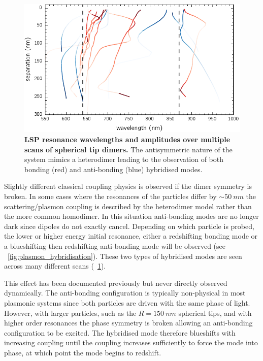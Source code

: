 \documentclass[a4paper]{article}
\begin{document}
\begin{figure}[h]
\centering
\includegraphics{figures/classical_mode_fits}
\caption[LSP resonance wavelengths and amplitudes over multiple scans of spherical tip dimers]{\textbf{LSP resonance wavelengths and amplitudes over multiple scans of spherical tip dimers.} The antisymmetric nature of the system mimics a heterodimer leading to the observation of both bonding (red) and anti-bonding (blue) hybridised modes.}
\label{fig:heterodimer_measurements}
\end{figure}

Slightly different classical coupling physics is observed if the dimer symmetry is broken. In some cases where the resonances of the particles differ by $\sim\SI{50}{nm}$ the scattering/plasmon coupling is described by the heterodimer model rather than the more common homodimer. In this situation anti-bonding modes are no longer dark since dipoles do not exactly cancel. Depending on which particle is probed, the lower or higher energy initial resonance, either a redshifting bonding mode or a blueshifting then redshifting anti-bonding mode will be observed (see \figurename~\ref{fig:plasmon_hybridisation}). These two types of hybridised modes are seen across many different scans (\figurename~\ref{fig:heterodimer_measurements}).

This effect has been documented previously \cite{nordlander2004} but never directly observed dynamically. The anti-bonding configuration is typically non-physical in most plasmonic systems since both particles are driven with the same phase of light. However, with larger particles, such as the $R=\SI{150}{nm}$ spherical tips, and with higher order resonances the phase symmetry is broken allowing an anti-bonding configuration to be excited. {\color{red}The hybridised mode therefore blueshifts with increasing coupling until the coupling increases sufficiently to force the mode into phase, at which point the mode begins to redshift.}
\end{document}
